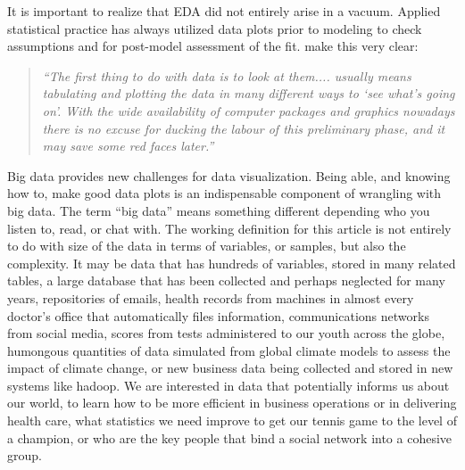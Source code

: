 \documentclass{article}
\begin{document}




It is important to realize that EDA did not entirely arise in a vacuum. Applied statistical practice has always utilized data plots prior to modeling to check assumptions and for post-model assessment of the fit. \citet{CH90} make this very clear:

\begin{quote}
{\em ``The first thing to do with data is to look at them.... usually
means tabulating and plotting the data in many different ways to `see
what's going on'. With the wide availability of computer packages and
graphics nowadays there is no excuse for ducking the labour of this
preliminary phase, and it may save some red faces later.''}
\end{quote}

\noindent Big data provides new challenges for data visualization. Being able, and knowing how to, make good data plots is an indispensable component of wrangling with big data. The term ``big data'' means something different depending who you listen to, read, or chat with. The working definition for this article is not entirely to do with size of the data in terms of variables, or samples, but also the complexity. It may be data that has hundreds of variables, stored in many related tables, a large database that has been collected and perhaps neglected for many years, repositories of emails, health records from machines in almost every doctor's office that automatically files information, communications networks from social media, scores from tests administered to our youth across the globe, humongous quantities of data simulated from global climate models to assess the impact of climate change, or new business data being collected and stored in new systems like hadoop. We are interested in data that potentially informs  us about our world, to learn how to be more efficient in business operations or in delivering health care, what statistics we need improve to get our tennis game to the level of a champion, or who are the key people that bind a social network into a cohesive group.
\end{document}
